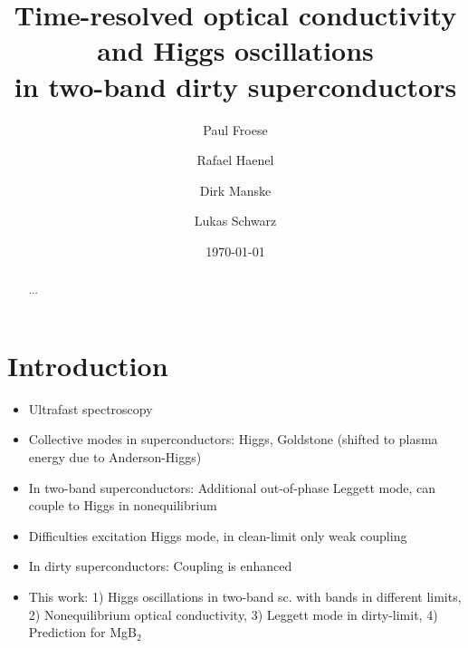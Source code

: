 \documentclass[aps,prb,reprint,noeprint,superscriptaddress]{revtex4-2}
\begin{document}
\title{Time-resolved optical conductivity and Higgs oscillations\\in two-band dirty superconductors}

\author{Paul Froese}

\author{Rafael Haenel}

\author{Dirk Manske}

\author{Lukas Schwarz}


\date{\today}

\begin{abstract}
...
\end{abstract}




\maketitle


\section{Introduction}
\label{sec:introduction}

\begin{itemize}
	\item Ultrafast spectroscopy
	\item Collective modes in superconductors: Higgs, Goldstone (shifted to plasma energy due to Anderson-Higgs)
	\item In two-band superconductors: Additional out-of-phase Leggett mode, can couple to Higgs in nonequilibrium
	\item Difficulties excitation Higgs mode, in clean-limit only weak coupling
	\item In dirty superconductors: Coupling is enhanced
	\item This work: 1) Higgs oscillations in two-band sc. with bands in different limits, 2) Nonequilibrium optical conductivity, 3) Leggett mode in dirty-limit, 4) Prediction for MgB$_2$
\end{itemize}
\end{document}
